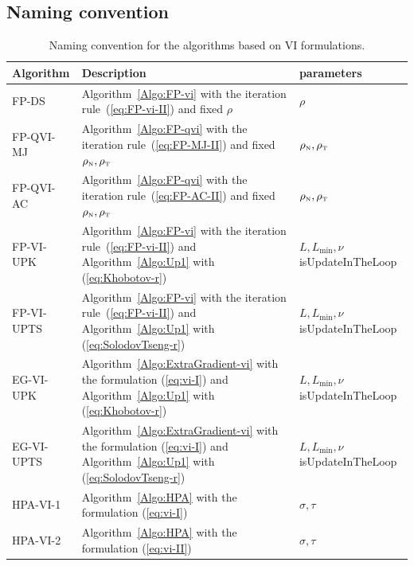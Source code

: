 \subsection{Naming convention}
\begin{table}
  \centering
  \begin{tabular}{|l|p{}|l|}
    \hline
    { Algorithm}
    & Description 
    & parameters\\
    \hline
    \sf FP-DS
    &  Algorithm~\ref{Algo:FP-vi} with the iteration rule~(\ref{eq:FP-vi-II}) and fixed $\rho$
    & $\rho$ \\
    \hline
    \sf FP-QVI-MJ
    &  Algorithm~\ref{Algo:FP-qvi} with the iteration rule~(\ref{eq:FP-MJ-II}) and fixed $\rho_{\hbox{\tiny{N}}},\rho_{\hbox{\tiny{T}}}$
    & $\rho_{\hbox{\tiny{N}}},\rho_{\hbox{\tiny{T}}}$\\
     \hline
    \sf FP-QVI-AC 
    &  Algorithm~\ref{Algo:FP-qvi} with the iteration rule~(\ref{eq:FP-AC-II}) and fixed $\rho_{\hbox{\tiny{N}}},\rho_{\hbox{\tiny{T}}}$
    & $\rho_{\hbox{\tiny{N}}},\rho_{\hbox{\tiny{T}}}$\\
    \hline
    \sf FP-VI-UPK
    &  Algorithm~\ref{Algo:FP-vi} with the iteration rule~(\ref{eq:FP-vi-II}) and Algorithm~\ref{Algo:Up1} with (\ref{eq:Khobotov-r}) 
    & $L, L_{\min}, \nu $ {\sf isUpdateInTheLoop}\\
    \hline
    \sf FP-VI-UPTS
    &  Algorithm~\ref{Algo:FP-vi} with the iteration rule~(\ref{eq:FP-vi-II}) and Algorithm~\ref{Algo:Up1} with (\ref{eq:SolodovTseng-r}) 
    & $L, L_{\min}, \nu $ {\sf isUpdateInTheLoop}\\
    \hline
    \sf EG-VI-UPK
    & Algorithm~\ref{Algo:ExtraGradient-vi} with the formulation (\ref{eq:vi-I}) and Algorithm~\ref{Algo:Up1} with (\ref{eq:Khobotov-r})
    &  $L, L_{\min}, \nu $ {\sf isUpdateInTheLoop}\\
    \hline
    \sf EG-VI-UPTS
    & Algorithm~\ref{Algo:ExtraGradient-vi} with the formulation (\ref{eq:vi-I}) and Algorithm~\ref{Algo:Up1} with (\ref{eq:SolodovTseng-r})
    & $L, L_{\min}, \nu $ {\sf isUpdateInTheLoop}\\
    \hline
    \sf HPA-VI-1 
    & Algorithm~\ref{Algo:HPA} with the formulation (\ref{eq:vi-I})
    & $\sigma,\tau$\\
    \hline
    \sf HPA-VI-2 
    & Algorithm~\ref{Algo:HPA} with the formulation (\ref{eq:vi-II})
    & $\sigma,\tau$\\ 
    \hline
  \end{tabular}
  \caption{Naming convention for the algorithms based on VI formulations.}
  \label{tab:Projection-algos}
\end{table}


